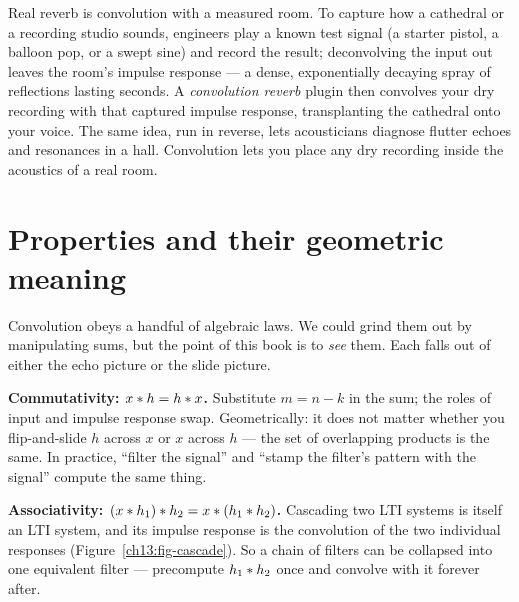 \begin{applicationbox}
Real reverb is convolution with a measured room. To capture how a cathedral or a
recording studio sounds, engineers play a known test signal (a starter pistol, a
balloon pop, or a swept sine) and record the result; deconvolving the input out
leaves the room's impulse response --- a dense, exponentially decaying spray of
reflections lasting seconds. A \emph{convolution reverb} plugin then convolves
your dry recording with that captured impulse response, transplanting the
cathedral onto your voice. The same idea, run in reverse, lets acousticians
diagnose flutter echoes and resonances in a hall. Convolution lets you place any
dry recording inside the acoustics of a real room.
\end{applicationbox}

\section{Properties and their geometric meaning}
\label{ch13:props}

Convolution obeys a handful of algebraic laws. We could grind them out by
manipulating sums, but the point of this book is to \emph{see} them. Each falls
out of either the echo picture or the slide picture.

\textbf{Commutativity: $x \ast h = h \ast x$.} Substitute $m = n-k$ in the
sum; the roles of input and impulse response swap. Geometrically: it does not
matter whether you flip-and-slide $h$ across $x$ or $x$ across $h$ --- the set
of overlapping products is the same. In practice, ``filter
the signal'' and ``stamp the filter's pattern with the signal'' compute the same
thing.

\textbf{Associativity: $(x \ast h_1) \ast h_2 = x \ast (h_1 \ast h_2)$.}
Cascading two LTI systems is itself an LTI system, and its impulse response is
the convolution of the two individual responses (Figure~\ref{ch13:fig-cascade}).
So a chain of filters can be collapsed into one equivalent filter --- precompute
$h_1 \ast h_2$ once and convolve with it forever after.

